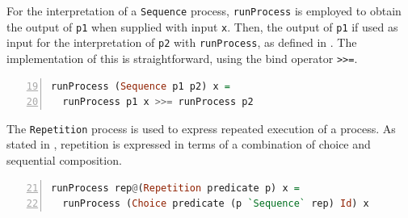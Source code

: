 For the interpretation of a \texttt{Sequence} process, \texttt{runProcess} is employed to obtain the output of \texttt{p1} when supplied with input \texttt{x}. Then, the output of \texttt{p1} if used as input for the interpretation of \texttt{p2} with \texttt{runProcess}, as defined in . The implementation of this is straightforward, using the bind operator \texttt{>}\texttt{>=}.
\begin{lstlisting}[language=Haskell,caption=Implementation of the interpreter for \texttt{Sequence} processes.,label=lst:local_runprocess_sequence,numbers=left,frame=bt,firstnumber=19]
runProcess (Sequence p1 p2) x =
  runProcess p1 x >>= runProcess p2
\end{lstlisting}

The \texttt{Repetition} process is used to express repeated execution of a process. As stated in , repetition is expressed in terms of a combination of choice and sequential composition.
\begin{lstlisting}[language=Haskell,caption=Implementation of the interpreter for \texttt{Repetition} processes.,numbers=left,frame=bt,firstnumber=21]
runProcess rep@(Repetition predicate p) x =
  runProcess (Choice predicate (p `Sequence` rep) Id) x
\end{lstlisting}

